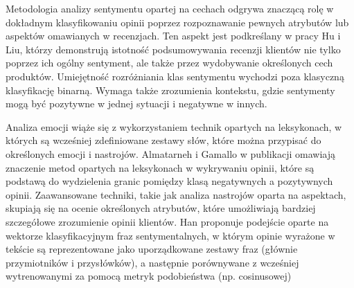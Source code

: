 \documentclass[runningheads]{llncs}
\begin{document}
Metodologia analizy sentymentu opartej na cechach odgrywa znaczącą rolę w dokładnym klasyfikowaniu opinii poprzez rozpoznawanie pewnych atrybutów lub aspektów omawianych w recenzjach\cite{10.1177/0165551514547842}\cite{10.1177/0165551519849516}. Ten aspekt jest podkreślany w pracy Hu i Liu, którzy demonstrują istotność podsumowywania recenzji klientów nie tylko poprzez ich ogólny sentyment, ale także przez wydobywanie określonych cech produktów\cite{10.1145/1014052.1014073}. Umiejętność rozróżniania klas sentymentu wychodzi poza klasyczną klasyfikację binarną. Wymaga także zrozumienia kontekstu, gdzie sentymenty mogą być pozytywne w jednej sytuacji i negatywne w innych\cite{10.1109/mis.2013.30}.

Analiza emocji wiąże się z wykorzystaniem technik opartych na leksykonach, w których są wcześniej zdefiniowane zestawy słów, które można przypisać do określonych emocji i nastrojów. Almatarneh i Gamallo w publikacji omawiają znaczenie metod opartych na leksykonach w wykrywaniu opinii, które są podstawą do wydzielenia granic pomiędzy klasą negatywnych a pozytywnych opinii\cite{10.1371/journal.pone.0197816}. Zaawansowane techniki, takie jak analiza nastrojów oparta na aspektach, skupiają się na ocenie określonych atrybutów, które umożliwiają bardziej szczegółowe zrozumienie opinii klientów\cite{10.1371/journal.pone.0207996}. Han \cite{10.1109/icnidc.2010.5657968} proponuje podejście oparte na wektorze klasyfikacyjnym fraz sentymentalnych, w którym opinie wyrażone w tekście są reprezentowane jako uporządkowane zestawy fraz (głównie przymiotników i przysłówków), a następnie porównywane z wcześniej wytrenowanymi za pomocą metryk podobieństwa (np. cosinusowej)
\end{document}
